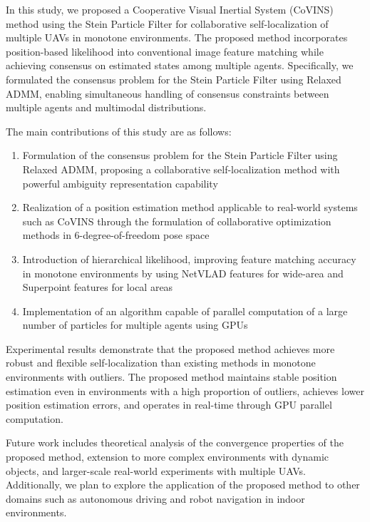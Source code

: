\documentclass[a4paper,fleqn,10pt,twocolumn]{SICE_ISCS}
\begin{document}
In this study, we proposed a Cooperative Visual Inertial System (CoVINS) method using the Stein Particle Filter for collaborative self-localization of multiple UAVs in monotone environments. The proposed method incorporates position-based likelihood into conventional image feature matching while achieving consensus on estimated states among multiple agents. Specifically, we formulated the consensus problem for the Stein Particle Filter using Relaxed ADMM, enabling simultaneous handling of consensus constraints between multiple agents and multimodal distributions.

The main contributions of this study are as follows:

\begin{enumerate}
\item Formulation of the consensus problem for the Stein Particle Filter using Relaxed ADMM, proposing a collaborative self-localization method with powerful ambiguity representation capability
\item Realization of a position estimation method applicable to real-world systems such as CoVINS through the formulation of collaborative optimization methods in 6-degree-of-freedom pose space
\item Introduction of hierarchical likelihood, improving feature matching accuracy in monotone environments by using NetVLAD features for wide-area and Superpoint features for local areas
\item Implementation of an algorithm capable of parallel computation of a large number of particles for multiple agents using GPUs
\end{enumerate}

Experimental results demonstrate that the proposed method achieves more robust and flexible self-localization than existing methods in monotone environments with outliers. The proposed method maintains stable position estimation even in environments with a high proportion of outliers, achieves lower position estimation errors, and operates in real-time through GPU parallel computation.

Future work includes theoretical analysis of the convergence properties of the proposed method, extension to more complex environments with dynamic objects, and larger-scale real-world experiments with multiple UAVs. Additionally, we plan to explore the application of the proposed method to other domains such as autonomous driving and robot navigation in indoor environments.
\end{document}
